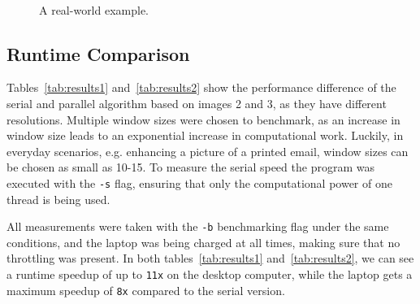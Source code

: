 \documentclass[sigconf]{acmart}
\begin{document}
\begin{figure}
     \\
    \caption{A real-world example. }
    \label{fig*:comparison3}
\end{figure}


\subsection{Runtime Comparison}
Tables~\ref{tab:results1} and~\ref{tab:results2} show the performance difference of the serial and parallel algorithm based on images 2 and 3, as they have different resolutions. Multiple window sizes were chosen to benchmark, as an increase in window size leads to an exponential increase in computational work. Luckily, in everyday scenarios, e.g. enhancing a picture of a printed email, window sizes can be chosen as small as 10-15.  
To measure the serial speed the program was executed with the \texttt{-s} flag, ensuring that only the computational power of one thread is being used.

All measurements were taken with the \texttt{-b} benchmarking flag under the same conditions, and the laptop was being charged at all times, making sure that no throttling was present. In both tables~\ref{tab:results1} and~\ref{tab:results2}, we can see a runtime speedup of up to \texttt{11x} on the desktop computer, while the laptop gets a maximum speedup of \texttt{8x} compared to the serial version.\newline 
\end{document}
